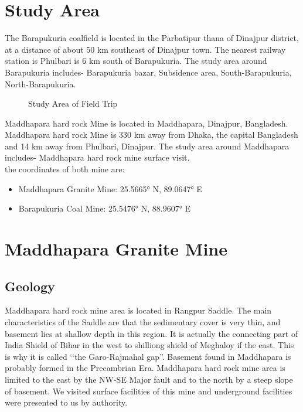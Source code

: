\documentclass[12pt,a4paper]{article}
\begin{document}
\section{Study Area}
The Barapukuria coalfield is located in the Parbatipur thana of Dinajpur district, at a distance of about 50 km southeast of Dinajpur town. The nearest railway station is Phulbari is 6 km south of Barapukuria. The study area around Barapukuria includes- Barapukuria bazar, Subsidence area, South-Barapukuria, North-Barapukuria.

\begin{figure}[ht]
\centering
{}
\caption{Study Area of Field Trip}
\end{figure}

\noindent
Maddhapara hard rock Mine is located in Maddhapara, Dinajpur, Bangladesh. Maddhapara hard rock Mine is 330 km away from Dhaka, the capital Bangladesh and 14 km away from Phulbari, Dinajpur. The study area around Maddhapara includes- Maddhapara hard rock mine surface visit.\\
the coordinates of both mine are:
\begin{itemize}
\item Maddhapara Granite Mine: 25.5665° N, 89.0647° E
\item Barapukuria Coal Mine: 25.5476° N, 88.9607° E
\end{itemize}

\section{Maddhapara Granite Mine}
\subsection{Geology}
Maddhapara hard rock mine area is located in Rangpur Saddle. The main characteristics of the Saddle are that the sedimentary cover is very thin, and basement lies at shallow depth in this region. It is actually the connecting part of India Shield of Bihar in the west to shilliong shield of Meghaloy if the east. This is why it is called ‘‘the Garo-Rajmahal gap”. Basement found in Maddhapara is probably formed in the Precambrian Era. Maddhapara hard rock mine area is limited to the east by the NW-SE Major fault and to the north by a steep slope of basement. We visited surface facilities of this mine and underground facilities were presented to us by authority.
\end{document}
